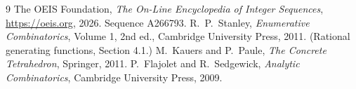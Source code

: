 \documentclass[11pt,a4paper]{article}
\theoremstyle{plain}
\theoremstyle{definition}
\begin{document}
\begin{thebibliography}{9}
 The OEIS Foundation, \emph{The On-Line Encyclopedia of Integer
Sequences}, \url{https://oeis.org}, 2026. Sequence A266793.
 R.~P.~Stanley, \emph{Enumerative Combinatorics}, Volume 1, 2nd ed.,
Cambridge University Press, 2011. (Rational generating functions, Section 4.1.)
 M.~Kauers and P.~Paule, \emph{The Concrete Tetrahedron}, Springer, 2011.
 P.~Flajolet and R.~Sedgewick, \emph{Analytic Combinatorics}, Cambridge
University Press, 2009.
\end{thebibliography}
\end{document}
